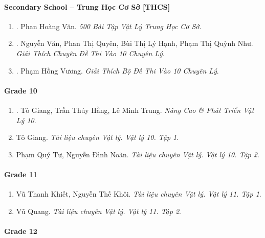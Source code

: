 \documentclass{article}
\begin{document}
\paragraph{Secondary School -- Trung Học Cơ Sở [THCS]}

\begin{enumerate}
	\item \cite{Van_500_BT_Vat_Ly_THCS}. Phan Hoàng Văn. {\it 500 Bài Tập Vật Lý Trung Học Cơ Sở}.\hfill{\sf[reading]}
	
	\item \cite{Van_Quyen_Hanh_Nhu_10_chuyen_Ly}. Nguyễn Văn, Phan Thị Quyên, Bùi Thị Lý Hạnh, Phạm Thị Quỳnh Như. {\it Giải Thích Chuyên Đề Thi Vào 10 Chuyên Lý}.\hfill{\sf[reading]}
	
	\item \cite{Vuong_10_chuyen_Ly}. Phạm Hồng Vương. {\it Giải Thích Bộ Đề Thi Vào 10 Chuyên Lý}.\hfill{\sf[reading]}
\end{enumerate}

\paragraph{Grade 10}

\begin{enumerate}
	\item \cite{Giang_Hang_Trung_ncpt_Vat_Ly_10}. Tô Giang, Trần Thúy Hằng, Lê Minh Trung. {\it Nâng Cao \& Phát Triển Vật Lý 10}.\hfill{\sf[reading]}
	
	\item Tô Giang. {\it Tài liệu chuyên Vật lý. Vật lý 10. Tập 1}.
	
	\item Phạm Quý Tư, Nguyễn Đình Noãn. {\it Tài liệu chuyên Vật lý. Vật lý 10. Tập 2}.
\end{enumerate}

\paragraph{Grade 11}

\begin{enumerate}
	\item Vũ Thanh Khiết, Nguyễn Thế Khôi. {\it Tài liệu chuyên Vật lý. Vật lý 11. Tập 1}.
	
	\item Vũ Quang. {\it Tài liệu chuyên Vật lý. Vật lý 11. Tập 2}.
\end{enumerate}

\paragraph{Grade 12}
\end{document}
